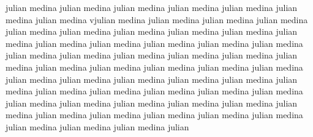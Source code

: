 julian medina julian medina julian medina julian medina julian medina julian medina julian medina vjulian medina julian medina julian medina julian medina julian medina julian medina julian medina julian medina julian medina julian medina julian medina julian medina julian medina julian medina julian medina julian medina julian medina julian medina julian medina julian medina julian medina julian medina julian medina julian medina julian medina julian medina julian medina julian medina julian medina julian medina julian medina julian medina julian medina julian medina julian medina julian medina julian medina julian medina julian medina julian medina julian medina julian medina julian medina julian medina julian medina julian medina julian medina julian medina julian medina julian medina julian medina julian 
